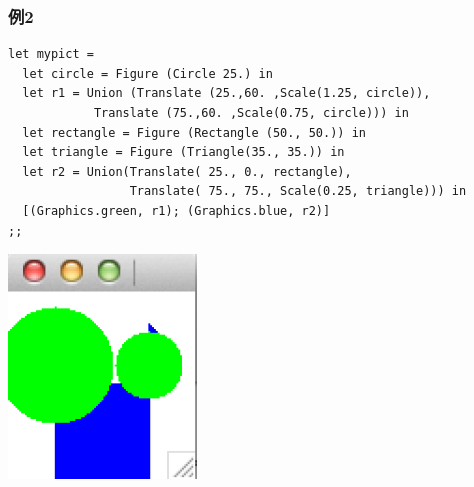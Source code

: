 \documentclass[a4paper,9pt]{jsarticle}
\begin{document}
\subsubsection{例2}

\begin{lstlisting}                                                                                                                                    
let mypict =                                                                                                                                  
  let circle = Figure (Circle 25.) in                                                                                                         
  let r1 = Union (Translate (25.,60. ,Scale(1.25, circle)),                                                                                   
            Translate (75.,60. ,Scale(0.75, circle))) in                                                                                      
  let rectangle = Figure (Rectangle (50., 50.)) in                                                                                            
  let triangle = Figure (Triangle(35., 35.)) in                                                                                               
  let r2 = Union(Translate( 25., 0., rectangle),                                                                                              
                 Translate( 75., 75., Scale(0.25, triangle))) in                                                                              
  [(Graphics.green, r1); (Graphics.blue, r2)]                                                                                                 
;;                                                                                                                                            
\end{lstlisting}

\includegraphics[width=5cm]{3_2.png}
\end{document}
